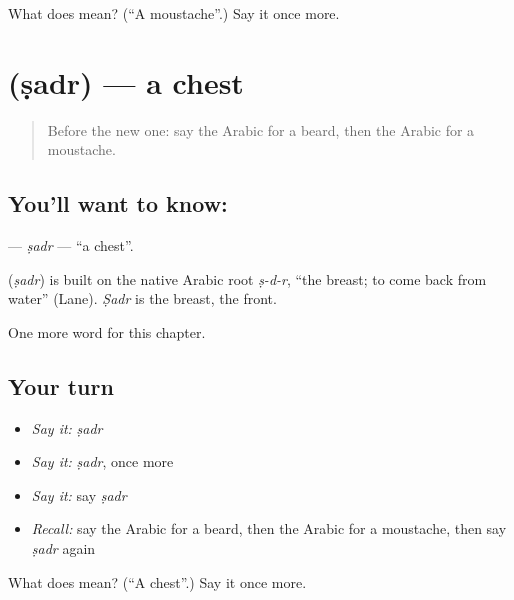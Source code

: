 \begin{tcolorbox}[breakable,colback=teal!4,colframe=teal!35!black,title={Before you move on}]
What does  mean? (\textquotedblleft{}A moustache\textquotedblright{}.) Say it once more.
\end{tcolorbox}
\section[\texorpdfstring{\ar{صدر} (ṣadr)}{صدر (ṣadr)}]{ (ṣadr) — a chest}

\label{lesson:AR-C139-sadr}



\begin{quote}
Before the new one: say the Arabic for a beard, then the Arabic for a moustache.
\end{quote}

\subsection*{You'll want to know: }
\textbf{} — \emph{ṣadr} — \textquotedblleft{}a chest\textquotedblright{}.

\begin{cousinweb}
\textbf{} (\emph{ṣadr}) is built on the native Arabic root \emph{ṣ-d-r}, \textquotedblleft{}the breast; to come back from water\textquotedblright{} (Lane). \emph{Ṣadr} is the breast, the front.
\end{cousinweb}

\begin{grammarlens}[title={What you've built}]
One more word for this chapter.
\end{grammarlens}

\subsection*{Your turn}
\begin{itemize}
\raggedright
  \item \emph{Say it:} \emph{ṣadr}
  \item \emph{Say it:} \emph{ṣadr}, once more
  \item \emph{Say it:} say \emph{ṣadr}
  \item \emph{Recall:} say the Arabic for a beard, then the Arabic for a moustache, then say \emph{ṣadr} again
\end{itemize}

\begin{tcolorbox}[breakable,colback=teal!4,colframe=teal!35!black,title={Before you move on}]
What does  mean? (\textquotedblleft{}A chest\textquotedblright{}.) Say it once more.
\end{tcolorbox}
